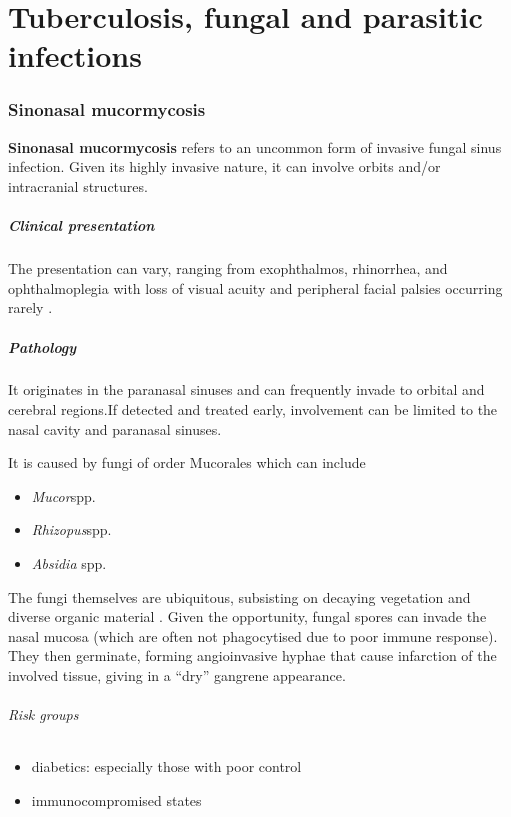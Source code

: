 \chapter{Tuberculosis, fungal and parasitic infections}

\subsection{Sinonasal mucormycosis}

\textbf{Sinonasal mucormycosis} refers to an uncommon form of invasive fungal sinus infection. Given its highly invasive nature, it can involve orbits and/or intracranial structures.

\paragraph{Clinical presentation}

The presentation can vary, ranging from exophthalmos, rhinorrhea, and ophthalmoplegia with loss of visual acuity and peripheral facial palsies occurring rarely .

\paragraph{Pathology}

It originates in the paranasal sinuses and can frequently invade to orbital and cerebral regions.If detected and treated early, involvement can be limited to the nasal cavity and paranasal sinuses.

It is caused by fungi of order Mucorales which can include

\begin{itemize}
	\tightlist
	\item
	\emph{Mucor}spp.
	\item
	\emph{Rhizopus}spp.
	\item
	\emph{Absidia} spp.
\end{itemize}

The fungi themselves are ubiquitous, subsisting on decaying vegetation and diverse organic material . Given the opportunity, fungal spores can invade the nasal mucosa (which are often not phagocytised due to poor immune response). They then germinate, forming angioinvasive hyphae that cause infarction of the involved tissue, giving in a ``dry'' gangrene appearance.

\subparagraph{Risk groups}

\begin{itemize}
	\tightlist
	\item
	diabetics: especially those with poor control 
	\item
	immunocompromised states
\end{itemize}

